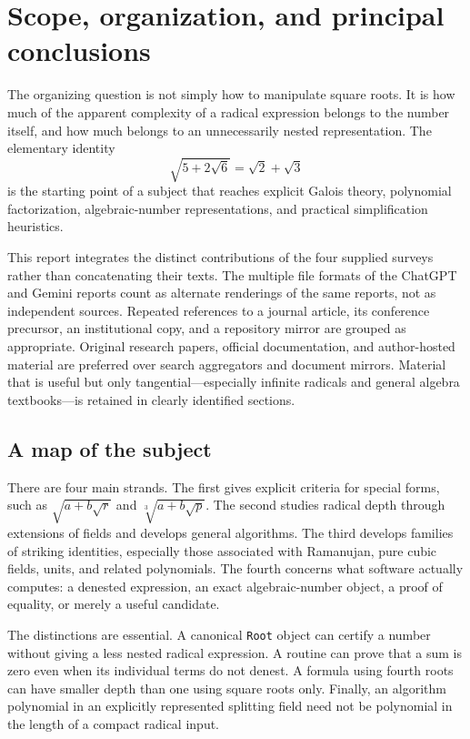 \documentclass[11pt,a4paper]{article}
\newcommand{\cbrt}[1]{\sqrt[3]{#1}}
\theoremstyle{definition}
\theoremstyle{remark}
\numberwithin{equation}{section}
\begin{document}
\section{Scope, organization, and principal conclusions}
\label{sec:scope}

The organizing question is not simply how to manipulate square roots. It is how much of the apparent complexity of a radical expression belongs to the number itself, and how much belongs to an unnecessarily nested representation. The elementary identity
\begin{equation}\label{eq:opening}
 \sqrt{5+2\sqrt6}=\sqrt2+\sqrt3
\end{equation}
is the starting point of a subject that reaches explicit Galois theory, polynomial factorization, algebraic-number representations, and practical simplification heuristics.

This report integrates the distinct contributions of the four supplied surveys rather than concatenating their texts. The multiple file formats of the ChatGPT and Gemini reports count as alternate renderings of the same reports, not as independent sources. Repeated references to a journal article, its conference precursor, an institutional copy, and a repository mirror are grouped as appropriate. Original research papers, official documentation, and author-hosted material are preferred over search aggregators and document mirrors. Material that is useful but only tangential---especially infinite radicals and general algebra textbooks---is retained in clearly identified sections.

\subsection{A map of the subject}

There are four main strands. The first gives explicit criteria for special forms, such as $\sqrt{a+b\sqrt r}$ and $\cbrt{a+b\sqrt p}$. The second studies radical depth through extensions of fields and develops general algorithms. The third develops families of striking identities, especially those associated with Ramanujan, pure cubic fields, units, and related polynomials. The fourth concerns what software actually computes: a denested expression, an exact algebraic-number object, a proof of equality, or merely a useful candidate.

The distinctions are essential. A canonical \texttt{Root} object can certify a number without giving a less nested radical expression. A routine can prove that a sum is zero even when its individual terms do not denest. A formula using fourth roots can have smaller depth than one using square roots only. Finally, an algorithm polynomial in an explicitly represented splitting field need not be polynomial in the length of a compact radical input.
\end{document}

